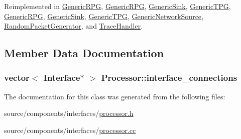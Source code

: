 Reimplemented in \hyperlink{classGenericRPG_a4303867728559ab6e6ae3d1390ede71}{GenericRPG}, \hyperlink{classGenericRPG_a4303867728559ab6e6ae3d1390ede71}{GenericRPG}, \hyperlink{classGenericSink_a1703a08208816130a4ee2f4d4a8334f}{GenericSink}, \hyperlink{classGenericTPG_c2e1dc7b0de824c846f37c4a1c282303}{GenericTPG}, \hyperlink{classGenericRPG_a4303867728559ab6e6ae3d1390ede71}{GenericRPG}, \hyperlink{classGenericSink_a1703a08208816130a4ee2f4d4a8334f}{GenericSink}, \hyperlink{classGenericTPG_c2e1dc7b0de824c846f37c4a1c282303}{GenericTPG}, \hyperlink{classGenericNetworkSource_8d8c0760eb634da3ccc3d4083e9415b9}{GenericNetworkSource}, \hyperlink{classRandomPacketGenerator_4031f11000db9e2693c761f7f47a4c88}{RandomPacketGenerator}, and \hyperlink{classTraceHandler_e2a56abded1637aba10677483fee4e32}{TraceHandler}.

\subsection{Member Data Documentation}
\hypertarget{classProcessor_63351f5faee21f5b43dce853b117ea23}{
\subsubsection[{interface\_\-connections}]{\setlength{\rightskip}{0pt plus 5cm}vector$<$ {\bf Interface}$\ast$ $>$ {\bf Processor::interface\_\-connections}}}
\label{classProcessor_63351f5faee21f5b43dce853b117ea23}




The documentation for this class was generated from the following files:\begin{CompactItemize}
\item 
source/components/interfaces/\hyperlink{processor_8h}{processor.h}\item 
source/components/interfaces/\hyperlink{processor_8cc}{processor.cc}\end{CompactItemize}
